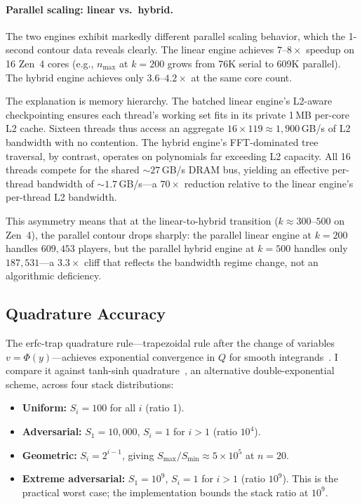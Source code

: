 \documentclass[11pt]{article}
\begin{document}
\paragraph{Parallel scaling: linear vs.\ hybrid.}
The two engines exhibit markedly different parallel scaling behavior, which
the 1-second contour data reveals clearly.  The linear engine achieves
$7$--$8\times$ speedup on 16 Zen~4 cores (e.g., $n_{\max}$ at $k = 200$
grows from 76K serial to 609K parallel).  The hybrid engine achieves only
$3.6$--$4.2\times$ at the same core count.

The explanation is memory hierarchy.  The batched linear engine's
L2-aware checkpointing ensures each thread's working set fits in its
private 1\,MB per-core L2 cache.  Sixteen threads thus access an aggregate
$16 \times 119 \approx 1{,}900$\,GB/s of L2 bandwidth with no contention.
The hybrid engine's FFT-dominated tree traversal, by contrast, operates on
polynomials far exceeding L2 capacity.  All 16 threads compete for the
shared ${\sim}27$\,GB/s DRAM bus, yielding an effective per-thread
bandwidth of ${\sim}1.7$\,GB/s---a $70\times$ reduction relative to the
linear engine's per-thread L2 bandwidth.

This asymmetry means that at the linear-to-hybrid transition ($k \approx
300$--$500$ on Zen~4), the parallel contour drops sharply: the parallel
linear engine at $k = 200$ handles $609{,}453$ players, but the parallel
hybrid engine at $k = 500$ handles only $187{,}531$---a $3.3\times$ cliff
that reflects the bandwidth regime change, not an algorithmic deficiency.

\subsection{Quadrature Accuracy}\label{sec:accuracy}

The erfc-trap quadrature rule---trapezoidal rule after the change of variables
$v = \Phi(y)$---achieves exponential convergence in $Q$ for smooth
integrands~\citep{trefethen2014}. I compare it against tanh-sinh
quadrature~\citep{mori2001}, an alternative double-exponential scheme, across
four stack distributions:

\begin{itemize}
  \item \textbf{Uniform:} $S_i = 100$ for all $i$ (ratio 1).
  \item \textbf{Adversarial:} $S_1 = 10{,}000$, $S_i = 1$ for $i > 1$
    (ratio $10^4$).
  \item \textbf{Geometric:} $S_i = 2^{i-1}$, giving $S_{\max}/S_{\min}
    \approx 5 \times 10^5$ at $n = 20$.
  \item \textbf{Extreme adversarial:} $S_1 = 10^9$, $S_i = 1$ for $i > 1$
    (ratio $10^9$). This is the practical worst case; the implementation
    bounds the stack ratio at $10^9$.
\end{itemize}
\end{document}
